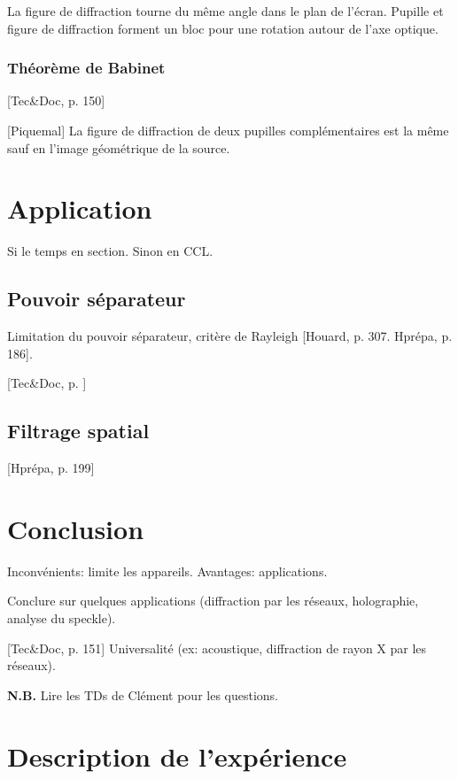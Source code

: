 \documentclass[11pt]{report}
\numberwithin{figure}{section}
\numberwithin{equation}{section}
\numberwithin{table}{section}
\newcommand{\1}{\boldsymbol{1}}
\begin{document}
La figure de diffraction tourne du même angle dans le plan de l’écran. Pupille et figure de diffraction forment un bloc pour une rotation autour de l’axe optique.




\subsubsection{Théorème de Babinet}

[Tec\&Doc, p. 150]

[Piquemal] La figure de diffraction de deux pupilles complémentaires est la même sauf en l’image géométrique de la source.

\section{Application}

Si le temps en section. Sinon en CCL.

\subsection{Pouvoir séparateur}

Limitation du pouvoir séparateur, critère de Rayleigh [Houard, p. 307. Hprépa, p. 186].

[Tec\&Doc, p. ]

\subsection{Filtrage spatial}

[Hprépa, p. 199]

\section*{Conclusion}


Inconvénients: limite les appareils. Avantages: applications.

Conclure sur quelques applications (diffraction par les réseaux, holographie, analyse du speckle).

[Tec\&Doc, p. 151] Universalité (ex: acoustique, diffraction de rayon X par les réseaux). 

\textbf{N.B.} Lire les TDs de Clément pour les questions.

\section*{Description de l'expérience}
\end{document}
